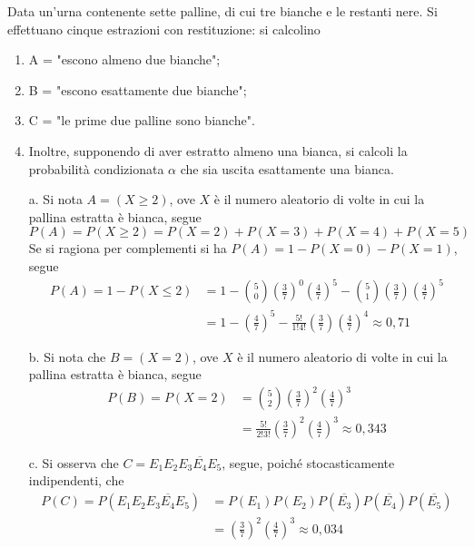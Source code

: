 \documentclass{subfiles}
\begin{document}
\begin{Example*}
    Data un'urna contenente sette palline, di cui tre bianche e le restanti nere. Si effettuano cinque estrazioni con restituzione: si calcolino
    \begin{enumerate}
        \item A = "escono almeno due bianche";
        \item B = "escono esattamente due bianche";
        \item C = "le prime due palline sono bianche".
        \item Inoltre, supponendo di aver estratto almeno una bianca, si calcoli la probabilità condizionata \(\alpha\) che sia uscita esattamente una bianca.
    \end{enumerate}
    \begin{enumerate}
        \item [a.] Si nota \(A = (X \ge 2)\), ove \(X\) è il numero aleatorio di volte in cui la pallina estratta è bianca, segue
              \[
                  P(A) = P(X \ge 2) = P(X = 2) + P(X = 3) + P(X = 4) + P(X = 5)
              \]
              Se si ragiona per complementi si ha \(P(A) = 1 - P(X = 0) - P(X = 1)\), segue
              \[\begin{aligned}
                      P(A) = 1 - P(X \le 2) & = 1 - \binom{5}{0}\left(\frac{3}{7}\right)^{0}\left(\frac{4}{7}\right)^{5} - \binom{5}{1}\left(\frac{3}{7}\right)\left(\frac{4}{7}\right)^{5} \\
                                            & = 1 - \left(\frac{4}{7}\right)^{5} - \frac{5!}{1!4!}\left(\frac{3}{7}\right)\left(\frac{4}{7}\right)^{4} \approx 0,71
                  \end{aligned}\]

        \item [b.] Si nota che \(B = (X = 2)\), ove \(X\) è il numero aleatorio di volte in cui la pallina estratta è bianca, segue
              \[\begin{aligned}
                      P(B) = P(X = 2) & = \binom{5}{2}\left(\frac{3}{7}\right)^{2}\left(\frac{4}{7}\right)^{3}                   \\
                                      & = \frac{5!}{2!3!}\left(\frac{3}{7}\right)^{2}\left(\frac{4}{7}\right)^{3}  \approx 0,343
                  \end{aligned}\]

        \item [c.] Si osserva che \(C = E_{1}E_{2}\overline{E_{3}E_{4}E_{5}}\), segue, poiché stocasticamente indipendenti, che
              \[\begin{aligned}
                      P(C) = P(E_{1}E_{2}\overline{E_{3}E_{4}E_{5}}) & = P(E_{1})P(E_{2})P(\overline{E_{3}})P(\overline{E_{4}})P(\overline{E_{5}}) \\
                                                                     & = \left(\frac{3}{7}\right)^{2} \left(\frac{4}{7}\right)^{3} \approx 0,034
                  \end{aligned}\]


\end{enumerate}
\end{Example*}
\end{document}
